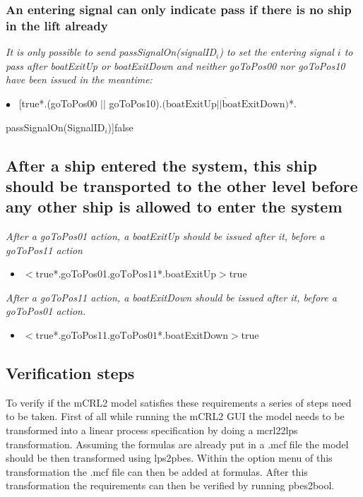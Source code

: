 \subsubsection{An entering signal can only indicate pass if there is no ship in the lift already}
\textit{It is only possible to send passSignalOn(signalID$_i$) to set the entering signal $i$ to pass after boatExitUp or boatExitDown and neither goToPos00 nor goToPos10 have been issued in the meantime:}\vspace{0.3cm}

	$\bullet$ ~[true*.(goToPos00 $||$ goToPos10).$\overline{\textrm{(boatExitUp} || \textrm{boatExitDown)}}$*.
		\begin{flushright}
			passSignalOn(SignalID$_i$)]false
		\end{flushright}
		
\subsection{After a ship entered the system, this ship should be transported to the other level before any other ship is allowed to enter the system}
\textit{After a goToPos01 action, a boatExitUp should be issued after it, before a goToPos11 action}

\begin{itemize}
	\item $<$true*.goToPos01.$\overline{\textrm{goToPos11}}$*.boatExitUp$>$true
\end{itemize}

\textit{After a goToPos11 action, a boatExitDown should be issued after it, before a goToPos01 action.}

\begin{itemize}
	\item $<$true*.goToPos11.$\overline{\textrm{goToPos01}}$*.boatExitDown$>$true
\end{itemize}

\subsection{Verification steps}
To verify if the mCRL2 model satisfies these requirements a series of steps need to be taken. First of all while running the mCRL2 GUI the model needs to be transformed into a linear process specification by doing a mcrl22lps transformation. Assuming the formulas are already put in a .mcf file the model should be then transformed using lps2pbes. Within the option menu of this transformation the .mcf file can then be added at formulas. After this transformation the requirements can then be verified by running pbes2bool.
